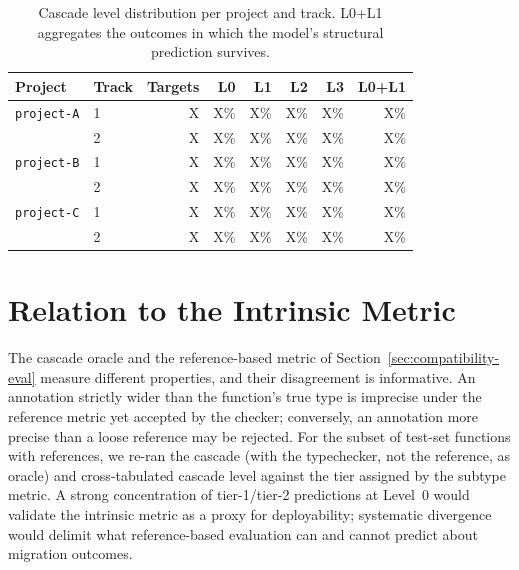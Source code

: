 \begin{table}[h]
\centering
\begin{tabular}{llrrrrrr}
\toprule
\textbf{Project} & \textbf{Track} & \textbf{Targets} & \textbf{L0} & \textbf{L1} & \textbf{L2} & \textbf{L3} & \textbf{L0+L1} \\
\midrule
\texttt{project-A} & 1 & X & X\% & X\% & X\% & X\% & X\% \\
                   & 2 & X & X\% & X\% & X\% & X\% & X\% \\
\texttt{project-B} & 1 & X & X\% & X\% & X\% & X\% & X\% \\
                   & 2 & X & X\% & X\% & X\% & X\% & X\% \\
\texttt{project-C} & 1 & X & X\% & X\% & X\% & X\% & X\% \\
                   & 2 & X & X\% & X\% & X\% & X\% & X\% \\
\bottomrule
\end{tabular}
\caption{Cascade level distribution per project and track. L0+L1 aggregates the outcomes in which the model's structural prediction survives.}
\label{tab:migration-results}
\end{table}


\section{Relation to the Intrinsic Metric}
\label{sec:migration-vs-intrinsic}

The cascade oracle and the reference-based metric of Section~\ref{sec:compatibility-eval} measure different properties, and their disagreement is informative.
An annotation strictly wider than the function's true type is imprecise under the reference metric yet accepted by the checker; conversely, an annotation more precise than a loose reference may be rejected.
For the subset of test-set functions with references, we re-ran the cascade (with the typechecker, not the reference, as oracle) and cross-tabulated cascade level against the tier assigned by the subtype metric.
A strong concentration of tier-1/tier-2 predictions at Level~0 would validate the intrinsic metric as a proxy for deployability; systematic divergence would delimit what reference-based evaluation can and cannot predict about migration outcomes.

